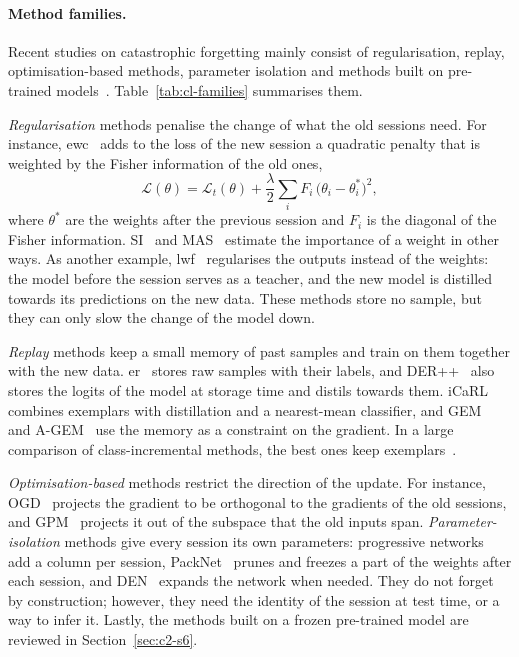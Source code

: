 \paragraph{Method families.} Recent studies on catastrophic forgetting mainly consist of
regularisation, replay, optimisation-based methods, parameter isolation and methods built
on pre-trained models~\citep{wang2024survey}. Table~\ref{tab:cl-families} summarises them.

\emph{Regularisation} methods penalise the change of what the old sessions need. For
instance, \gls{ewc}~\citep{kirkpatrick2017ewc} adds to the loss of the new session a
quadratic penalty that is weighted by the Fisher information of the old ones,
\begin{equation}
  \mathcal{L}(\theta)=\mathcal{L}_{t}(\theta)+\frac{\lambda}{2}\sum_{i}F_{i}\,
  \big(\theta_{i}-\theta^{\ast}_{i}\big)^{2},
  \label{eq:ewc}
\end{equation}
where $\theta^{\ast}$ are the weights after the previous session and $F_i$ is the diagonal
of the Fisher information. SI~\citep{zenke2017si} and MAS~\citep{aljundi2018mas} estimate
the importance of a weight in other ways. As another example, \gls{lwf}~\citep{li2017lwf}
regularises the outputs instead of the weights: the model before the session serves as a
teacher, and the new model is distilled towards its predictions on the new data. These
methods store no sample, but they can only slow the change of the model down.

\emph{Replay} methods keep a small memory of past samples and train on them together with
the new data. \Gls{er}~\citep{rolnick2019er} stores raw samples with
their labels, and DER++~\citep{buzzega2020der} also stores the logits of the model at
storage time and distils towards them. iCaRL~\citep{rebuffi2017icarl} combines exemplars
with distillation and a nearest-mean classifier, and GEM~\citep{lopezpaz2017gem} and
A-GEM~\citep{chaudhry2019agem} use the memory as a constraint on the gradient. In a large
comparison of class-incremental methods, the best ones keep
exemplars~\citep{masana2022class}.

\emph{Optimisation-based} methods restrict the direction of the update. For instance,
OGD~\citep{farajtabar2020ogd} projects the gradient to be orthogonal to the gradients of
the old sessions, and GPM~\citep{saha2021gpm} projects it out of the subspace that the old
inputs span. \emph{Parameter-isolation} methods give every session its own parameters:
progressive networks~\citep{rusu2016pnn} add a column per session,
PackNet~\citep{mallya2018packnet} prunes and freezes a part of the weights after each
session, and DEN~\citep{yoon2018den} expands the network when needed. They do not forget by
construction; however, they need the identity of the session at test time, or a way to
infer it. Lastly, the methods built on a frozen pre-trained model are reviewed in
Section~\ref{sec:c2-s6}.

